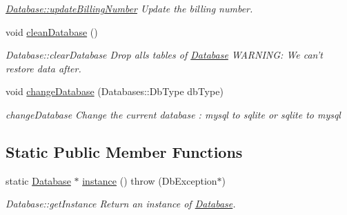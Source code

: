 \begin{DoxyCompactItemize}
\begin{DoxyCompactList}\small\item\em \hyperlink{classDatabases_1_1Database_a17b652086514e0a64d0e452a938ac7a5}{Database\-::update\-Billing\-Number} Update the billing number. \end{DoxyCompactList}\item 
\hypertarget{classDatabases_1_1Database_a52c30975504e35c7c475a52817d66b73}{void \hyperlink{classDatabases_1_1Database_a52c30975504e35c7c475a52817d66b73}{clean\-Database} ()}\label{classDatabases_1_1Database_a52c30975504e35c7c475a52817d66b73}

\begin{DoxyCompactList}\small\item\em Database\-::clear\-Database Drop alls tables of \hyperlink{classDatabases_1_1Database}{Database} W\-A\-R\-N\-I\-N\-G\-: We can't restore data after. \end{DoxyCompactList}\item 
void \hyperlink{classDatabases_1_1Database_a7d5635c502e3eab85635c35a7b3a81e1}{change\-Database} (Databases\-::\-Db\-Type db\-Type)
\begin{DoxyCompactList}\small\item\em change\-Database Change the current database \-: mysql to sqlite or sqlite to mysql \end{DoxyCompactList}\end{DoxyCompactItemize}
\subsection*{Static Public Member Functions}
\begin{DoxyCompactItemize}
\item 
static \hyperlink{classDatabases_1_1Database}{Database} $\ast$ \hyperlink{classDatabases_1_1Database_af75844a67cca710cc2d7edbff95ebe81}{instance} ()  throw (\-Db\-Exception$\ast$)
\begin{DoxyCompactList}\small\item\em Database\-::get\-Instance Return an instance of \hyperlink{classDatabases_1_1Database}{Database}. \end{DoxyCompactList}\end{DoxyCompactItemize}
